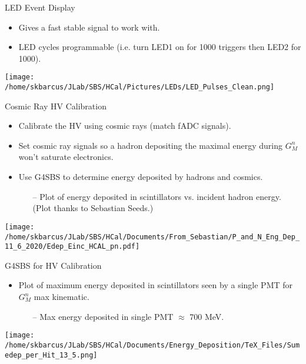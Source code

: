\documentclass[10pt]{beamer}
\begin{document}
\begin{frame}{LED Event Display}

	\begin{itemize}
		\item Gives a fast stable signal to work with.
		\item LED cycles programmable (i.e. turn LED1 on for 1000 triggers then LED2 for 1000).
	\end{itemize}

	\begin{center}
		\texttt{[image: /home/skbarcus/JLab/SBS/HCal/Pictures/LEDs/LED\_Pulses\_Clean.png]}
  	\end{center}

\end{frame}

\begin{frame}{Cosmic Ray HV Calibration}
	\vspace{-0mm}
	\begin{itemize}
		\item Calibrate the HV using cosmic rays (match fADC signals).
		\item Set cosmic ray signals so a hadron depositing the maximal energy during $G_M^n$ won't saturate electronics.
		\item Use G4SBS to determine energy deposited by hadrons and cosmics.
		\begin{itemize}
			\item[--] Plot of energy deposited in scintillators vs. incident hadron energy. (Plot thanks to Sebastian Seeds.)
		\end{itemize}
	\end{itemize}

	\vspace{-3mm}
	\begin{center}
	\texttt{[image: /home/skbarcus/JLab/SBS/HCal/Documents/From\_Sebastian/P\_and\_N\_Eng\_Dep\_11\_6\_2020/Edep\_Einc\_HCAL\_pn.pdf]}
	\end{center}

\end{frame}

\begin{frame}{G4SBS for HV Calibration}

	\begin{itemize}
		\item Plot of maximum energy deposited in scintillators seen by a single PMT for $G_M^n$ max kinematic.
			\begin{itemize}
				\item[--] Max energy deposited in single PMT $\approx$ 700 MeV.
			\end{itemize}
	\end{itemize}

	\begin{center}
	\texttt{[image: /home/skbarcus/JLab/SBS/HCal/Documents/Energy\_Deposition/TeX\_Files/Sumedep\_per\_Hit\_13\_5.png]}
	\end{center}

\end{frame}
\end{document}
